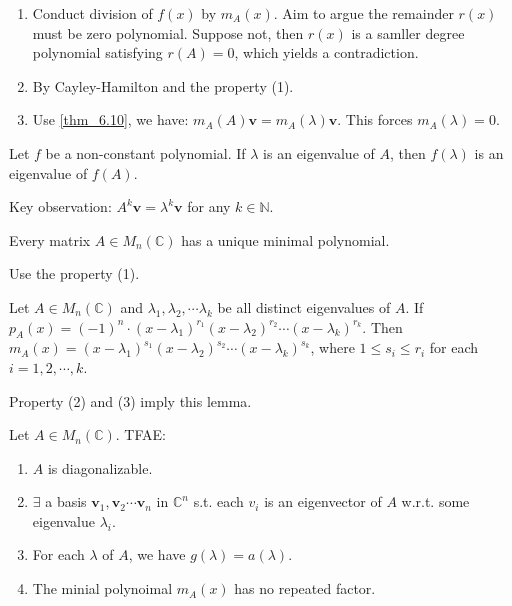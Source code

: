 \documentclass[12pt]{article}
\begin{document}
\begin{pfbox}
    \begin{enumerate}
        \item Conduct division of $f(x)$ by $m_A(x)$. Aim to argue the remainder $r(x)$ must be zero polynomial. Suppose not, then $r(x)$ is a samller degree polynomial satisfying $r(A)=0$, which yields a contradiction.
        \item By Cayley-Hamilton and the property (1).
        \item Use \eqref{thm_6.10}, we have: $m_A(A)\mathbf{v}=m_A(\lambda)\mathbf{v}$. This forces $m_A(\lambda)=0.$
    \end{enumerate}
\end{pfbox}

\begin{theorem}
    Let $f$ be a non-constant polynomial. If $\lambda$ is an eigenvalue of $A$,
    then $f(\lambda)$ is an eigenvalue of $f(A)$.
    \label{thm_6.10}
\end{theorem}

\begin{pfbox}
    Key observation: $A^k\mathbf{v} =\lambda^k\mathbf{v}$ for any $k\in\mathbb{N}$.
\end{pfbox}

\begin{lemma}
    Every matrix $A\in M_n(\mathbb{C})$ has a unique minimal polynomial.
\end{lemma}
\begin{pfbox}
    Use the property (1).
\end{pfbox}

\begin{lemma}
     Let $A\in M_n(\mathbb{C})$ and $\lambda_1, \lambda_2, \cdots\lambda_k$ be all distinct eigenvalues of $A$.
     If $p_A(x)=(-1)^n\cdot(x-\lambda_1)^{r_1}(x-\lambda_2)^{r_2}\cdots(x-\lambda_k)^{r_k}$.
     Then $m_A(x)=(x-\lambda_1)^{s_1}(x-\lambda_2)^{s_2}\cdots(x-\lambda_k)^{s_k}$,
     where $1\le s_i \le r_i$ for each $i=1,2,\cdots,k$.
\end{lemma}

\begin{pfbox}
    Property (2) and (3) imply this lemma.
\end{pfbox}





\begin{theorem}
Let $A\in M_n(\mathbb{C})$. TFAE:
\begin{enumerate}
    \item $A$ is diagonalizable.
    \item $\exists$ a basis ${\mathbf{v}_1,\mathbf{v}_2\cdots\mathbf{v}_n}$ in $\mathbb{C}^n$ s.t. each $v_i$ is an eigenvector of $A$ w.r.t. some eigenvalue $\lambda_i$.
    \item For each $\lambda$ of $A$, we have $g(\lambda)=a(\lambda)$.
    \item The minial polynoimal $m_A(x)$ has no repeated factor.
\end{enumerate}
\end{theorem}
\end{document}
